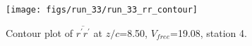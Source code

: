 \begin{figure}[H]
\centering
\texttt{[image: figs/run\_33/run\_33\_rr\_contour]}
\caption{Contour plot of $\overline{r^\prime r^\prime}$ at $z/c$=8.50, $V_{free}$=19.08, station 4.}
\label{fig:run_33_rr_contour}
\end{figure}


